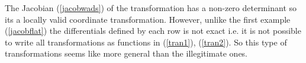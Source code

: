 \documentclass[preprint,aps,tightenlines,showkeys,nofootinbib,superscriptaddress,amsmath]{revtex4}
\begin{document}
The Jacobian (\ref{jacobwads}) of the transformation has a non-zero
determinant so its a locally valid coordinate transformation. However,
unlike the first example (\ref{jacobflat}) the differentials defined
by each row is not exact i.e. it is not possible to write all transformations as
functions in (\ref{tran1}), (\ref{tran2}). So this type of
transformations seems like more general than the illegitimate ones.
\end{document}
